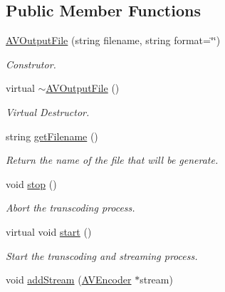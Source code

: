 \subsection*{Public Member Functions}
\begin{DoxyCompactItemize}
\item 
\hyperlink{classbr_1_1ufscar_1_1lince_1_1xpta_1_1streaming_1_1AVOutputFile_a974ab5f4710f389613902efcf0869cd2}{AVOutputFile} (string filename, string format=\char`\"{}\char`\"{})
\begin{DoxyCompactList}\small\item\em Construtor. \item\end{DoxyCompactList}\item 
virtual \hyperlink{classbr_1_1ufscar_1_1lince_1_1xpta_1_1streaming_1_1AVOutputFile_a98e890c64fa56a855c1e913c931bbd86}{$\sim$AVOutputFile} ()
\begin{DoxyCompactList}\small\item\em Virtual Destructor. \item\end{DoxyCompactList}\item 
string \hyperlink{classbr_1_1ufscar_1_1lince_1_1xpta_1_1streaming_1_1AVOutputFile_aa76efd5719eaf5703eab0a9f6f3d250d}{getFilename} ()
\begin{DoxyCompactList}\small\item\em Return the name of the file that will be generate. \item\end{DoxyCompactList}\item 
void \hyperlink{classbr_1_1ufscar_1_1lince_1_1xpta_1_1streaming_1_1AVOutputFile_ae243b5d1d810fb2a12aabf42fa4d493b}{stop} ()
\begin{DoxyCompactList}\small\item\em Abort the transcoding process. \item\end{DoxyCompactList}\item 
virtual void \hyperlink{classbr_1_1ufscar_1_1lince_1_1xpta_1_1streaming_1_1AVOutputFile_a12bd9f754bbd73bb8bba3f8176f3d712}{start} ()
\begin{DoxyCompactList}\small\item\em Start the transcoding and streaming process. \item\end{DoxyCompactList}\item 
void \hyperlink{classbr_1_1ufscar_1_1lince_1_1xpta_1_1streaming_1_1AVOutputFile_aadb51cfcc435317a17e61cf23823bcef}{addStream} (\hyperlink{classbr_1_1ufscar_1_1lince_1_1xpta_1_1streaming_1_1AVEncoder}{AVEncoder} $\ast$stream)

\end{DoxyCompactItemize}
